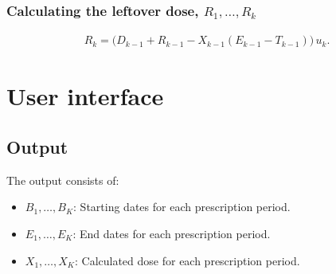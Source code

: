 \documentclass{article}
\begin{document}
\subsubsection{Calculating the leftover dose, \({R}_1,\ldots, {R}_{k}\)}
\label{sec:orgheadline6}

\begin{align*}
{R}_{k} = \Big( D_{k-1} + {R}_{k-1} - {X}_{k-1} \left( {E}_{k-1} - {T}_{k-1} \right) \Big) \, u_{k}.\end{align*}



\section{User interface}
\label{sec:orgheadline9}

\subsection{Output}
\label{sec:orgheadline8}

The output consists of:

\begin{itemize}
\item \({B}_1, \ldots, B_{{K}}\): Starting dates for each prescription
period.
\item \({E}_1, \ldots, E_{{K}}\): End dates for each prescription period.
\item \({X}_1, \ldots, {X}_{{K}}\): Calculated dose for each prescription
period.
\end{itemize}



\end{document}
